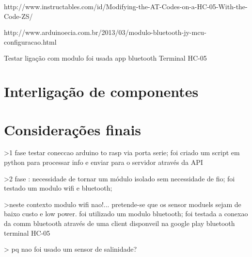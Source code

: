 http://www.instructables.com/id/Modifying-the-AT-Codes-on-a-HC-05-With-the-Code-ZS/


http://www.arduinoecia.com.br/2013/03/modulo-bluetooth-jy-mcu-configuracao.html


Testar ligação com modulo foi usada app bluetooth Terminal HC-05






\newpage
\section{Interligação de componentes}





\section{Considerações finais}


>1 fase testar coneccao arduino to rasp via porta serie; foi criado um script em python para processar info e enviar para o servidor através da API 

>2 fase : necessidade de tornar um módulo isolado sem necessidade de fio; foi testado um modulo wifi e bluetooth; 

>neste contexto modulo wifi nao!... pretende-se que os sensor moduels sejam de baixo custo e low power. foi utilizado um modulo bluetooth; foi testada a conexao da comm bluetooth através de uma client disponveil na google play bluetooth terminal HC-05 


> 
pq nao foi usado um sensor de salinidade?



 

